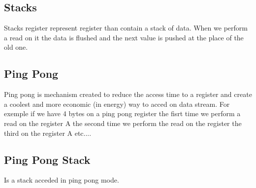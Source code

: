 \documentclass[11pt]{report}
\begin{document}
\subsection{Stacks}
Stacks register represent register than contain a stack of data. When we perform a read on it
the data is flushed and the next value is pushed at the place of the old one.

\subsection{Ping Pong}
Ping pong is mechanism created to reduce the access time to a register and create a coolest and
more economic (in energy) way to acced on data stream. For exemple if we have 4 bytes on a 
ping pong register the fisrt time we perform a read on the register A the second time we perform
the read on the register the third on the register A etc....

\subsection{Ping Pong Stack}
Is a stack acceded in ping pong mode.
\end{document}
